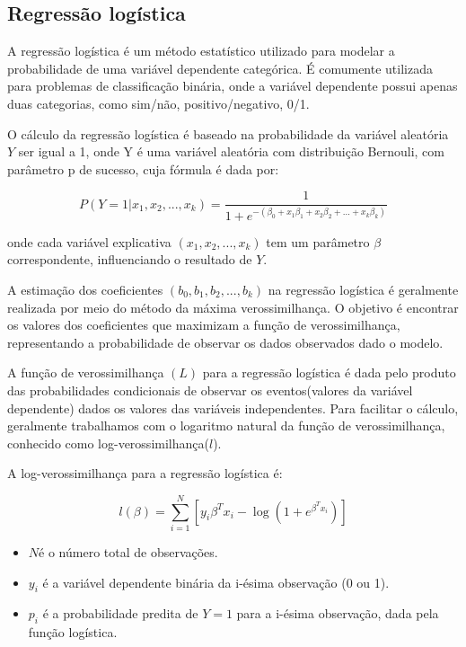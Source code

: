 
 \subsection{Regressão logística}
 A regressão logística é um método estatístico utilizado para modelar a probabilidade de uma variável 
dependente categórica. É comumente utilizada para problemas de classificação binária, onde a variável
dependente possui apenas duas categorias, como sim/não, positivo/negativo, 0/1.


O cálculo da regressão logística é baseado na probabilidade da variável aleatória $Y$ ser igual a 1, onde Y é 
uma variável aleatória com distribuição Bernouli, com parâmetro p de sucesso, cuja fórmula é dada por:

\begin{equation}
  P(Y=1| x_1, x_2, ..., x_k) = \frac{1}{1 + e^{-(\beta_0 + x_{1}\beta_1 + x_{2}\beta_2 + \ldots + x_{k}\beta_k)}}
\end{equation}

\noindent onde cada variável explicativa $(x_1, x_2, ..., x_k)$ tem um parâmetro $\beta$ correspondente, influenciando o resultado de $Y$.

A estimação dos coeficientes $(b_0, b_1, b_2, ..., b_k)$  na regressão logística é geralmente realizada por meio 
do método da máxima verossimilhança. O objetivo é encontrar os valores dos coeficientes que maximizam a função de
verossimilhança, representando a probabilidade de observar os dados observados dado o modelo.
 
A função de verossimilhança $(L)$ para a regressão logística é dada pelo produto das probabilidades condicionais
de observar os eventos(valores da variável dependente) dados os valores das variáveis independentes. Para facilitar o cálculo, 
geralmente trabalhamos com o logaritmo natural da função de verossimilhança, conhecido como log-verossimilhança($l$).

A log-verossimilhança para a regressão logística é:

\begin{equation}
  l(\beta) = \sum_{i=1}^{N} [y_i \beta^T x_i - \log(1 + e^{\beta^T x_i})]
\end{equation}


\begin{itemize}
  \item  $N$é o número total de observações.
  \item  $y_i$ é a variável dependente binária da i-ésima observação (0 ou 1).
  \item $p_i$ é a probabilidade predita de $Y=1$ para a i-ésima observação, dada pela função logística.
\end{itemize}

